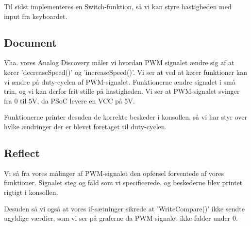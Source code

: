 \documentclass[../main.tex]{subfiles}
\begin{document}
Til sidst implementeres en Switch-funktion, så vi kan styre hastigheden med input fra keyboardet.

\subsection{Document}
Vha. vores Analog Discovery måler vi hvordan PWM signalet ændre sig af at kører ’decreaseSpeed()’ og ’increaseSpeed()’.
Vi ser at ved at kører funktioner kan vi ændre på duty-cyclen af PWM-signalet. Funktionerne ændre signalet i små trin, og vi kan derfor frit stille på hastigheden. Vi ser at PWM-signalet svinger fra 0 til 5V, da PSoC levere en VCC på 5V.

Funktionerne printer desuden de korrekte beskeder i konsollen, så vi har styr over hvlke ændringer der er blevet foretaget til duty-cyclen.

\subsection{Reflect}    
Vi så fra vores målinger af PWM-signalet den opførsel forventede af vores funktioner. Signalet steg og fald som vi specificerede, og beskederne blev printet rigtigt i konsollen.

Desuden så vi også at vores if-sætninger sikrede at ’WriteCompare()’ ikke sendte ugyldige værdier, som vi ser på graferne da PWM-signalet ikke falder under 0.
\end{document}
